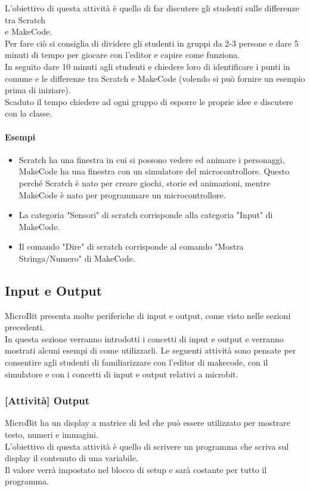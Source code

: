 \documentclass[../../docenti.tex]{subfiles}
\begin{document}
L'obiettivo di questa attività è quello di far discutere gli studenti sulle differenze tra Scratch\\ e MakeCode.\\
Per fare ciò si consiglia di dividere gli studenti in gruppi da 2-3 persone e dare 5 minuti di tempo per giocare con l'editor e capire come funziona.\\
In seguito dare 10 minuti agli studenti e chiedere loro di identificare i punti in comune e le differenze tra Scratch e MakeCode (volendo si può fornire un esempio prima di iniziare).\\
Scaduto il tempo chiedere ad ogni gruppo di esporre le proprie idee e discutere con la classe.

\paragraph{Esempi}
\begin{itemize}
	\item Scratch ha una finestra in cui si possono vedere ed animare i personaggi, MakeCode ha una finestra con un simulatore del microcontrollore. Questo perché Scratch è nato per creare giochi, storie ed animazioni, mentre MakeCode è nato per programmare un microcontrollore.
	\item La categoria "Sensori" di scratch corrisponde alla categoria "Input" di MakeCode.
	\item Il comando "Dire" di scratch corrisponde al comando "Mostra Stringa/Numero" di MakeCode.
\end{itemize}

\subsection{Input e Output}
MicroBit presenta molte periferiche di input e output, come visto nelle sezioni precedenti.\\
In questa sezione verranno introdotti i concetti di input e output e verranno mostrati alcuni esempi di come utilizzarli.
Le seguenti attività sono pensate per consentire agli studenti di familiarizzare con l'editor di makecode, con il simulatore e con i concetti di input e output relativi a microbit.

\subsubsection{[Attività] Output}
MicroBit ha un display a matrice di led che può essere utilizzato per mostrare testo, numeri e immagini.\\
L'obiettivo di questa attività è quello di scrivere un programma che scriva sul display il contenuto di una variabile.\\
Il valore verrà impostato nel blocco di setup e sarà costante per tutto il programma.
\end{document}
